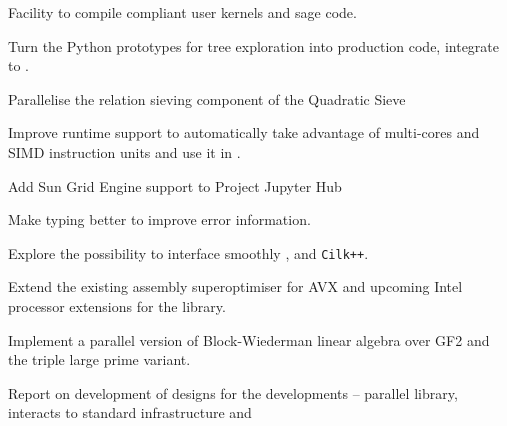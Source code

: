 \begin{workpackage}
\begin{wpdelivs}
  \begin{wpdeliv}[due=3,id=pythran-sage,dissem=PU,nature=DEM,lead=UJF]
      {Facility to compile \Pythran compliant user kernels and sage code.}
  \end{wpdeliv}
  \begin{wpdeliv}[due=3,id=HPCcombi,dissem=PU,nature=DEM,lead=PS]
      {Turn the Python prototypes for tree exploration into production code, integrate to \Sage.}
\end{wpdeliv}
  \begin{wpdeliv}[due=6,id=QS-sieving,dissem=PU,nature=DEM,lead=UK]
      {Parallelise the relation sieving component of the Quadratic Sieve}
  \end{wpdeliv}
  \begin{wpdeliv}[due=9,id=pythran-cython,dissem=PU,nature=DEM,lead=LL]
      {Improve \Pythran runtime support to automatically take advantage of multi-cores and SIMD instruction units and use it in \Cython.}
  \end{wpdeliv}
  \begin{wpdeliv}[due=12,id=SGE-jupyter,dissem=PU,nature=OTHER,lead=USH]
      {Add Sun Grid Engine support to Project Jupyter Hub}
  \end{wpdeliv}
  \begin{wpdeliv}[due=12,id=pythran-typing,dissem=PU,nature=DEM, lead=UJF]
      {Make \Pythran typing better to improve error information.}
  \end{wpdeliv}
  \begin{wpdeliv}[due=12,id=HPCcombi,dissem=PU,nature=DEM,lead=LL]
      {Explore the possibility to interface smoothly \Pythran, \Cython and \texttt{Cilk++}.}
\end{wpdeliv}
  \begin{wpdeliv}[due=12,id=MPIRsuperoptimiser,dissem=PU,nature=DEM,lead=UK]
      {Extend the existing assembly superoptimiser for AVX and upcoming Intel
        processor extensions for the \MPIR library.}
\end{wpdeliv}
  \begin{wpdeliv}[due=18,id=QS-linalg,dissem=PU,nature=DEM,lead=UK]
      {Implement a parallel version of Block-Wiederman linear algebra over GF2 and the triple large prime variant.}
  \end{wpdeliv}
  \begin{wpdeliv}[due=18,id=GAP-hpc-report,dissem=PU,nature=R,lead=SA]
    {Report on development of designs for the \GAP developments --
      parallel library, interacts to standard infrastructure and
}
\end{wpdeliv}
\end{wpdelivs}
\end{workpackage}
